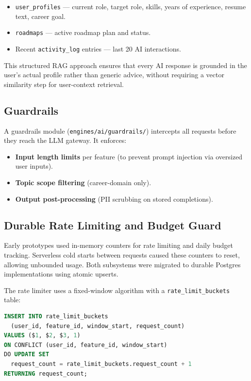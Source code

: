 \documentclass[conference]{IEEEtran}
\begin{document}
\begin{itemize}
  \item \texttt{user\_profiles} --- current role, target role, skills, years
        of experience, resume text, career goal.
  \item \texttt{roadmaps} --- active roadmap plan and status.
  \item Recent \texttt{activity\_log} entries --- last 20 AI interactions.
\end{itemize}

This structured RAG approach ensures that every AI response is grounded in
the user's actual profile rather than generic advice, without requiring a
vector similarity step for user-context retrieval.

\subsection{Guardrails}

A guardrails module (\texttt{engines/ai/guardrails/}) intercepts all requests
before they reach the LLM gateway. It enforces:

\begin{itemize}
  \item \textbf{Input length limits} per feature (to prevent prompt injection
        via oversized user inputs).
  \item \textbf{Topic scope filtering} (career-domain only).
  \item \textbf{Output post-processing} (PII scrubbing on stored completions).
\end{itemize}

\subsection{Durable Rate Limiting and Budget Guard}
\label{sec:ratelimit}

Early prototypes used in-memory counters for rate limiting and daily budget
tracking. Serverless cold starts between requests caused these counters to
reset, allowing unbounded usage. Both subsystems were migrated to durable
Postgres implementations using atomic upserts.

The rate limiter uses a fixed-window algorithm with a \texttt{rate\_limit\_buckets}
table:

\begin{lstlisting}[language=SQL, caption={Rate-limit bucket upsert (simplified).}]
INSERT INTO rate_limit_buckets
  (user_id, feature_id, window_start, request_count)
VALUES ($1, $2, $3, 1)
ON CONFLICT (user_id, feature_id, window_start)
DO UPDATE SET
  request_count = rate_limit_buckets.request_count + 1
RETURNING request_count;
\end{lstlisting}
\end{document}

